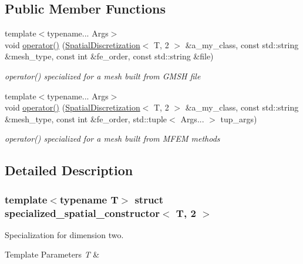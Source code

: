 \subsection*{Public Member Functions}
\begin{DoxyCompactItemize}
\item 
{\footnotesize template$<$typename... Args$>$ }\\void \hyperlink{structspecialized__spatial__constructor_3_01T_00_012_01_4_a73c0c12c16ce0c3fb7fb13050e3b7037}{operator()} (\hyperlink{classSpatialDiscretization}{Spatial\+Discretization}$<$ T, 2 $>$ \&a\+\_\+my\+\_\+class, const std\+::string \&mesh\+\_\+type, const int \&fe\+\_\+order, const std\+::string \&file)
\begin{DoxyCompactList}\small\item\em operator() specialized for a mesh built from G\+M\+SH file \end{DoxyCompactList}\item 
{\footnotesize template$<$typename... Args$>$ }\\void \hyperlink{structspecialized__spatial__constructor_3_01T_00_012_01_4_a042d171694bc56092b0473257797a730}{operator()} (\hyperlink{classSpatialDiscretization}{Spatial\+Discretization}$<$ T, 2 $>$ \&a\+\_\+my\+\_\+class, const std\+::string \&mesh\+\_\+type, const int \&fe\+\_\+order, std\+::tuple$<$ Args... $>$ tup\+\_\+args)
\begin{DoxyCompactList}\small\item\em operator() specialized for a mesh built from M\+F\+EM methods \end{DoxyCompactList}\end{DoxyCompactItemize}


\subsection{Detailed Description}
\subsubsection*{template$<$typename T$>$\newline
struct specialized\+\_\+spatial\+\_\+constructor$<$ T, 2 $>$}

Specialization for dimension two. 


\begin{DoxyTemplParams}{Template Parameters}
{\em T} & \\
\hline
\end{DoxyTemplParams}



